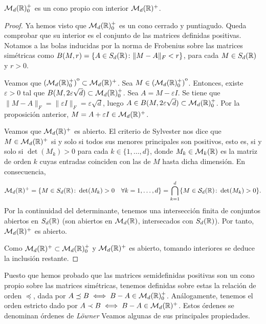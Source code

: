\begin{cor}
    $\mathcal{M}_d(\mathbb{R})^+_0$ es un cono propio con interior $\mathcal{M}_d(\mathbb{R})^+$.
\end{cor}
\begin{proof}
    Ya hemos visto que $\mathcal{M}_d(\mathbb{R})^+_0$ es un cono cerrado y puntiagudo. Queda comprobar que su interior es el conjunto de las matrices definidas positivas. Notamos a las bolas inducidas por la norma de Frobenius sobre las matrices simétricas como $B(M,r) = \{ A \in S_d(\mathbb{R}) \colon \|M - A\|_F < r\}$, para cada $M \in S_d(\mathbb{R})$ y $r > 0$.

    Veamos que ${\kern0pt(\mathcal{M}_d(\mathbb{R})^+_0)}^{\mathrm{o}} \subset \mathcal{M}_d(\mathbb{R})^+$. Sea $M \in {\kern0pt(\mathcal{M}_d(\mathbb{R})^+_0)}^{\mathrm{o}}$. Entonces, existe $\varepsilon > 0$ tal que $B(M,2\varepsilon\sqrt{d}) \subset \mathcal{M}_d(\mathbb{R})^+_0$. Sea $A = M - \varepsilon I$. Se tiene que $\|M - A\|_F = \|\varepsilon I\|_F = \varepsilon\sqrt{d}$, luego $A \in B(M,2\varepsilon\sqrt{d}) \subset \mathcal{M}_d(\mathbb{R})^+_0$. Por la proposición anterior, $M = A + \varepsilon I \in \mathcal{M}_d(\mathbb{R})^+$.

    Veamos que $\mathcal{M}_d(\mathbb{R})^+$ es abierto. El criterio de Sylvester nos dice que $M \in \mathcal{M}_d(\mathbb{R})^+$ si y solo si todos sus menores principales son positivos, esto es, si y solo si $\det(M_k) > 0$ para cada $k \in \{1,\dots,d\}$, donde $M_k \in \mathcal{M}_k(\mathbb{R})$ es la matriz de orden $k$ cuyas entradas coinciden con las de $M$ hasta dicha dimensión. En consecuencia,
    \[\mathcal{M}_d(\mathbb{R})^+ = \{M \in S_d(\mathbb{R}) \colon \det(M_k) > 0 \quad \forall k = 1,\dots,d \} = \bigcap_{k=1}^d\{M \in \mathcal{S}_d(\mathbb{R}) \colon \det(M_k) > 0 \}. \]
    Por la continuidad del determinante, tenemos una intersección finita de conjuntos abiertos en $S_d(\mathbb{R})$ (son abiertos en $\mathcal{M}_d(\mathbb{R})$, intersecados con $S_d(\mathbb{R})$). Por tanto, $\mathcal{M}_d(\mathbb{R})^+$ es abierto.

    Como $\mathcal{M}_d(\mathbb{R})^+ \subset \mathcal{M}_d(\mathbb{R})^+_0$ y $\mathcal{M}_d(\mathbb{R})^+$ es abierto, tomando interiores se deduce la inclusión restante.
\end{proof}

Puesto que hemos probado que las matrices semidefinidas positivas son un cono propio sobre las matrices simétricas, tenemos definidas sobre estas la relación de orden $\preceq$, dada por $A \preceq B \iff B - A \in \mathcal{M}_d(\mathbb{R})^+_0$. Análogamente, tenemos el orden estricto dado por $A \prec B \iff B - A \in \mathcal{M}_d(\mathbb{R})^+$. Estos órdenes se denominan órdenes de \emph{Löwner} Veamos algunas de sus principales propiedades.

